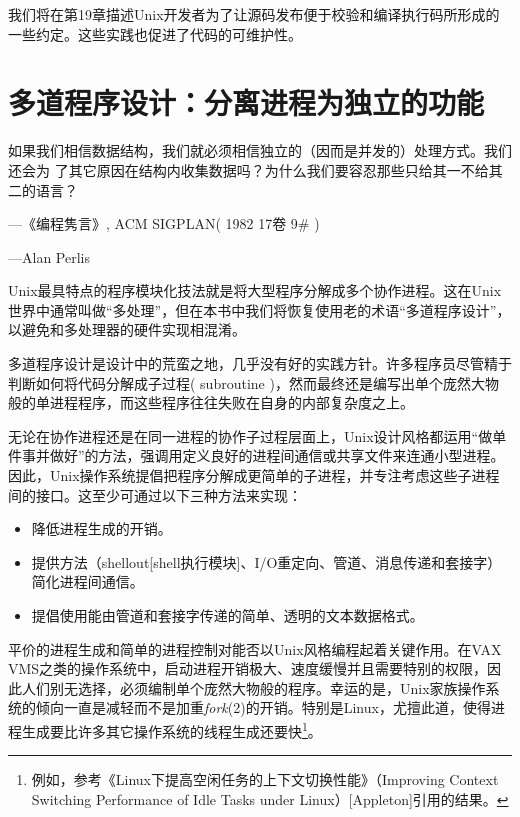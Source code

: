 \documentclass[12pt,oneside]{book}
\begin{document}
\begin{common-format}
我们将在第19章描述Unix开发者为了让源码发布便于校验和编译执行码所形成的一些约定。这些实践也促进了代码的可维护性。


\chapter{多道程序设计：分离进程为独立的功能}
\begin{flushright}
\begin{notecard}{30em}
如果我们相信数据结构，我们就必须相信独立的（因而是并发的）处理方式。我们还会为
了其它原因在结构内收集数据吗？为什么我们要容忍那些只给其一不给其二的语言？

{\hfill —《编程隽言》, ACM SIGPLAN( 1982 17卷 9\#{} )}

{\hfill —Alan Perlis}
\end{notecard}
\end{flushright}

Unix最具特点的程序模块化技法就是将大型程序分解成多个协作进程。这在Unix世界中通常叫做“多处理”，但在本书中我们将恢复使用老的术语“多道程序设计”，以避免和多处理器的硬件实现相混淆。

多道程序设计是设计中的荒蛮之地，几乎没有好的实践方针。许多程序员尽管精于判断如何将代码分解成子过程( subroutine )，然而最终还是编写出单个庞然大物般的单进程程序，而这些程序往往失败在自身的内部复杂度之上。

无论在协作进程还是在同一进程的协作子过程层面上，Unix设计风格都运用“做单件事并做好”的方法，强调用定义良好的进程间通信或共享文件来连通小型进程。因此，Unix操作系统提倡把程序分解成更简单的子进程，并专注考虑这些子进程间的接口。这至少可通过以下三种方法来实现：
\begin{itemize}
\item 降低进程生成的开销。
\item 提供方法（shellout[shell执行模块]、I/O重定向、管道、消息传递和套接字）简化进程间通信。
\item 提倡使用能由管道和套接字传递的简单、透明的文本数据格式。
\end{itemize}

平价的进程生成和简单的进程控制对能否以Unix风格编程起着关键作用。在VAX VMS之类的操作系统中，启动进程开销极大、速度缓慢并且需要特别的权限，因此人们别无选择，必须编制单个庞然大物般的程序。幸运的是，Unix家族操作系统的倾向一直是减轻而不是加重\textit{fork}(2)的开销。特别是Linux，尤擅此道，使得进程生成要比许多其它操作系统的线程生成还要快\footnote{例如，参考《Linux下提高空闲任务的上下文切换性能》（Improving Context Switching Performance of Idle Tasks under Linux）[Appleton]引用的结果。}。


\end{common-format}
\end{document}
